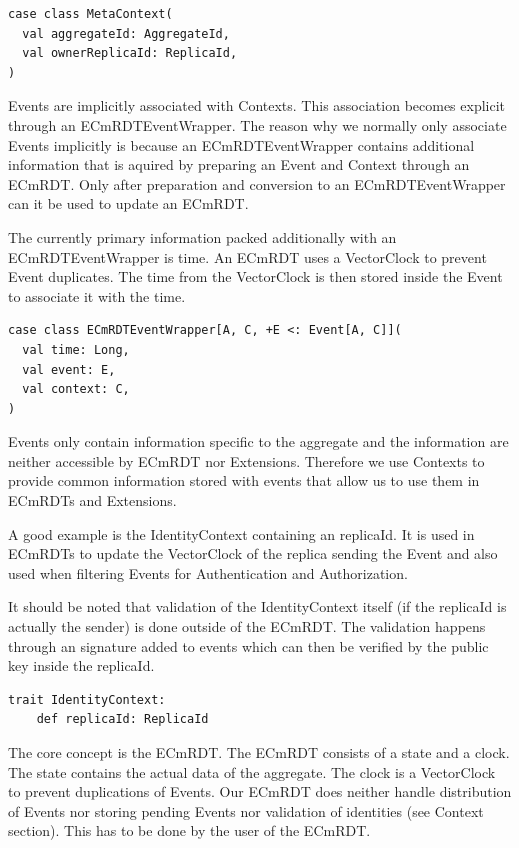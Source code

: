 \documentclass[
	ngerman,
	ruledheaders=section,   %
	class=report,		    %
	thesis={type=bachelor}, %
	accentcolor=9c,			%
	custommargins=true,    %
	marginpar=false,        %
	parskip=half-,          %
	fontsize=11pt,          %
]{tudapub}
\begin{document}
\begin{lstlisting}
case class MetaContext(
  val aggregateId: AggregateId,
  val ownerReplicaId: ReplicaId,
)
\end{lstlisting}

Events are implicitly associated with Contexts. This association becomes explicit through an ECmRDTEventWrapper. The reason why we normally only associate Events implicitly is because an ECmRDTEventWrapper contains additional information that is aquired by preparing an Event and Context through an ECmRDT. Only after preparation and conversion to an ECmRDTEventWrapper can it be used to update an ECmRDT. 

The currently primary information packed additionally with an ECmRDTEventWrapper is time. An ECmRDT uses a VectorClock to prevent Event duplicates. The time from the VectorClock is then stored inside the Event to associate it with the time.

\begin{lstlisting}
case class ECmRDTEventWrapper[A, C, +E <: Event[A, C]](
  val time: Long,
  val event: E,
  val context: C,
)
\end{lstlisting}

Events only contain information specific to the aggregate and the information are neither accessible by ECmRDT nor Extensions. Therefore we use Contexts to provide common information stored with events that allow us to use them in ECmRDTs and Extensions. 

A good example is the IdentityContext containing an replicaId. It is used in ECmRDTs to update the VectorClock of the replica sending the Event and also used when filtering Events for Authentication and Authorization.

It should be noted that validation of the IdentityContext itself (if the replicaId is actually the sender) is done outside of the ECmRDT. The validation happens through an signature added to events which can then be verified by the public key inside the replicaId.

\begin{lstlisting}
trait IdentityContext:
	def replicaId: ReplicaId
\end{lstlisting}

The core concept is the ECmRDT. The ECmRDT consists of a state and a clock. The state contains the actual data of the aggregate. The clock is a VectorClock to prevent duplications of Events. Our ECmRDT does neither handle distribution of Events nor storing pending Events nor validation of identities (see Context section). This has to be done by the user of the ECmRDT.
\end{document}
